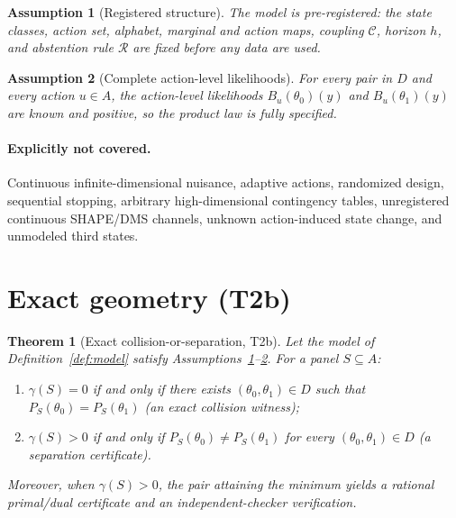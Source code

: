 \documentclass[11pt]{article}
\newtheorem{theorem}{Theorem}
\newtheorem{assumption}{Assumption}
\begin{document}
\begin{assumption}[Registered structure]\label{ass:reg}
The model is pre-registered: the state classes, action set, alphabet, marginal and action maps, coupling
$\mathcal{C}$, horizon $h$, and abstention rule $\mathcal{R}$ are fixed before any data are used.
\end{assumption}

\begin{assumption}[Complete action-level likelihoods]\label{ass:likelihood}
For every pair in $D$ and every action $u\in A$, the action-level likelihoods $B_u(\theta_0)(y)$ and
$B_u(\theta_1)(y)$ are known and positive, so the product law is fully specified.
\end{assumption}

\paragraph{Explicitly not covered.}
Continuous infinite-dimensional nuisance, adaptive actions, randomized design, sequential stopping,
arbitrary high-dimensional contingency tables, unregistered continuous SHAPE/DMS channels, unknown
action-induced state change, and unmodeled third states.

\section{Exact geometry (T2b)}\label{sec:t2b}
\begin{theorem}[Exact collision-or-separation, T2b]\label{thm:t2b}
Let the model of Definition~\ref{def:model} satisfy Assumptions~\ref{ass:reg}--\ref{ass:likelihood}.
For a panel $S\subseteq A$:
\begin{enumerate}[nosep]
  \item $\gamma(S)=0$ \emph{if and only if} there exists $(\theta_0,\theta_1)\in D$ such that
        $P_S(\theta_0)=P_S(\theta_1)$ (an \emph{exact collision witness});
  \item $\gamma(S)>0$ \emph{if and only if} $P_S(\theta_0)\neq P_S(\theta_1)$ for every
        $(\theta_0,\theta_1)\in D$ (a \emph{separation certificate}).
\end{enumerate}
Moreover, when $\gamma(S)>0$, the pair attaining the minimum yields a rational primal/dual certificate
and an independent-checker verification.
\end{theorem}
\end{document}
